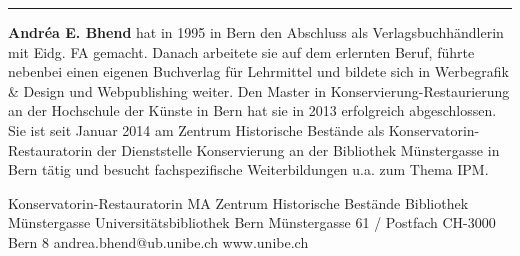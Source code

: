 \begin{center}\rule{0.5\linewidth}{0.5pt}\end{center}

\textbf{Andréa E. Bhend} hat in 1995 in Bern den Abschluss als
Verlagsbuchhändlerin mit Eidg. FA gemacht. Danach arbeitete sie auf dem
erlernten Beruf, führte nebenbei einen eigenen Buchverlag für Lehrmittel
und bildete sich in Werbegrafik \& Design und Webpublishing weiter. Den
Master in Konservierung-Restaurierung an der Hochschule der Künste in
Bern hat sie in 2013 erfolgreich abgeschlossen. Sie ist seit Januar 2014
am Zentrum Historische Bestände als Konservatorin-Restauratorin der
Dienststelle Konservierung an der Bibliothek Münstergasse in Bern tätig
und besucht fachspezifische Weiterbildungen u.a. zum Thema IPM.

Konservatorin-Restauratorin MA\newline
Zentrum Historische Bestände\newline
Bibliothek Münstergasse\newline
Universitätsbibliothek Bern\newline
Münstergasse 61 / Postfach\newline
CH-3000 Bern 8\newline
andrea.bhend@ub.unibe.ch\newline
www.unibe.ch\newline
